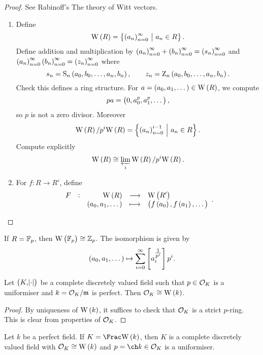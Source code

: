 \pagebreak

\begin{proof}
See Rabinoff's The theory of Witt vectors.
\begin{enumerate}
\item Define
$$ \W\br{R} = \cbr{\br{a_n}_{n = 0}^\infty \st a_n \in R}. $$
Define addition and multiplication by $ \br{a_n}_{n = 0}^\infty + \br{b_n}_{n = 0}^\infty = \br{s_n}_{n = 0}^\infty $ and $ \br{a_n}_{n = 0}^\infty\br{b_n}_{n = 0}^\infty = \br{z_n}_{n = 0}^\infty $ where
$$ s_n = \S_n\br{a_0, b_0, \dots, a_n, b_n}, \qquad z_n = \Z_n\br{a_0, b_0, \dots, a_n, b_n}. $$
Check this defines a ring structure. For $ a = \br{a_0, a_1, \dots} \in \W\br{R} $, we compute
$$ pa = \br{0, a_0^p, a_1^p, \dots}, $$
so $ p $ is not a zero divisor. Moreover
$$ \W\br{R} / p^i\W\br{R} = \cbr{\br{a_n}_{n = 0}^{i - 1} \st a_n \in R}. $$
Compute explicitly
$$ \W\br{R} \cong \varprojlim_i \W\br{R} / p^i\W\br{R}. $$
\item For $ f : R \to R' $, define
$$ \function[F]{\W\br{R}}{\W\br{R'}}{\br{a_0, a_1, \dots}}{\br{f\br{a_0}, f\br{a_1}, \dots}}. $$
\end{enumerate}
\end{proof}

\begin{remark*}
If $ R = \mathbb{F}_p $, then $ \W\br{\FF_p} \cong \ZZ_p $. The isomorphism is given by
$$ \br{a_0, a_1, \dots} \mapsto \sum_{i = 0}^\infty \sbr{a_i^{\tfrac{1}{p^i}}}p^i. $$
\end{remark*}

\begin{proposition}
Let $ \br{K, \abs{\cdot}} $ be a complete discretely valued field such that $ p \in \mathcal{O}_K $ is a uniformiser and $ k = \mathcal{O}_K / \mathfrak{m} $ is perfect. Then $ \OOO_K \cong \W\br{k} $.
\end{proposition}

\begin{proof}
By uniqueness of $ \W\br{k} $, it suffices to check that $ \mathcal{O}_K $ is a strict $ p $-ring. This is clear from properties of $ \mathcal{O}_K $.
\end{proof}


\begin{remark*}
Let $ k $ be a perfect field. If $ K = \Frac \W\br{k} $, then $ K $ is a complete discretely valued field with $ \OOO_K \cong \W\br{k} $ and $ p = \ch k \in \OOO_K $ is a uniformiser.
\end{remark*}

